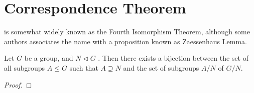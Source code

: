\documentclass[notoc,notitlepage]{tufte-book}
\begin{document}
\section{Correspondence Theorem}%
\label{sec:correspondence_theorem}

 is somewhat widely known 
as the Fourth Isomorphism Theorem, although some authors associates
the name with a proposition known as 
\href{https://en.wikipedia.org/wiki/Zassenhaus_lemma}{Zaessenhaus Lemma}.

\begin{thm}\label{thm:correspondence_theorem}
  Let $G$ be a group, and $N \triangleleft G$
  . Then there exists a bijection between
  the set of all subgroups $A \leq G$ such that $A \supseteq N$
  and the set of subgroups $A / N$ of $G / N$.
\end{thm}

\begin{proof}
\end{proof}



\backmatter

\pagestyle{plain}

\nobibliography*


\printindex
\end{document}
